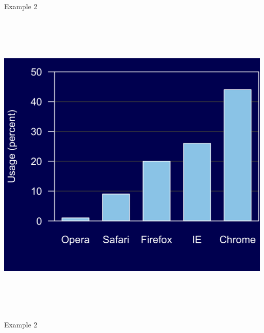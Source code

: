 \documentclass[12pt]{article}
\newcommand{\headsize}{\fontsize{35}{35} \selectfont}
\begin{document}
\newpage


\headsize \color{myyellow}
\hfill \begin{minipage}{5.75in}
\centering
Example 2
\end{minipage}

\vspace{30mm}

\centerline{\includegraphics[height=6in]{Figs/fig2a_rev.png}}




\newpage


\headsize \color{myyellow}
\hfill \begin{minipage}{5.75in}
\centering
Example 2
\end{minipage}

\vspace{30mm}
\end{document}

